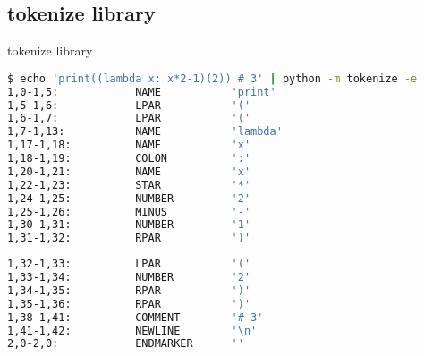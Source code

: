 \subsection{{\ttfamily tokenize} library}

\begin{frame}[fragile]{{\ttfamily tokenize} library}
\begin{lstlisting}[language=bash, numbers=none]
$ echo 'print((lambda x: x*2-1)(2)) # 3' | python -m tokenize -e
1,0-1,5:            NAME           'print'        
1,5-1,6:            LPAR           '('            
1,6-1,7:            LPAR           '('            
1,7-1,13:           NAME           'lambda'       
1,17-1,18:          NAME           'x'            
1,18-1,19:          COLON          ':'            
1,20-1,21:          NAME           'x'            
1,22-1,23:          STAR           '*'            
1,24-1,25:          NUMBER         '2'            
1,25-1,26:          MINUS          '-'            
1,30-1,31:          NUMBER         '1'            
1,31-1,32:          RPAR           ')'            
\end{lstlisting}
\end{frame}

\begin{frame}[fragile]
\begin{lstlisting}[language=bash, numbers=none]
1,32-1,33:          LPAR           '('            
1,33-1,34:          NUMBER         '2'            
1,34-1,35:          RPAR           ')'            
1,35-1,36:          RPAR           ')'            
1,38-1,41:          COMMENT        '# 3'          
1,41-1,42:          NEWLINE        '\n'           
2,0-2,0:            ENDMARKER      ''   
\end{lstlisting}
\end{frame}
